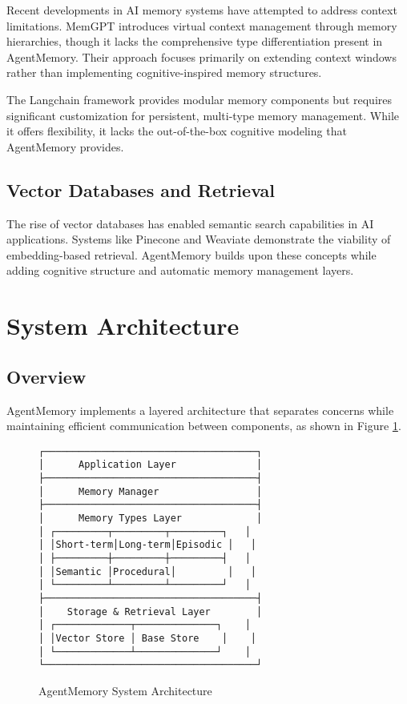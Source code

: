 \documentclass[journal]{IEEEtran}
\begin{document}
Recent developments in AI memory systems have attempted to address context limitations. MemGPT \cite{charles2023} introduces virtual context management through memory hierarchies, though it lacks the comprehensive type differentiation present in AgentMemory. Their approach focuses primarily on extending context windows rather than implementing cognitive-inspired memory structures.

The Langchain framework \cite{chase2022} provides modular memory components but requires significant customization for persistent, multi-type memory management. While it offers flexibility, it lacks the out-of-the-box cognitive modeling that AgentMemory provides.

\subsection{Vector Databases and Retrieval}

The rise of vector databases has enabled semantic search capabilities in AI applications. Systems like Pinecone and Weaviate demonstrate the viability of embedding-based retrieval. AgentMemory builds upon these concepts while adding cognitive structure and automatic memory management layers.

\section{System Architecture}

\subsection{Overview}

AgentMemory implements a layered architecture that separates concerns while maintaining efficient communication between components, as shown in Figure \ref{fig:architecture}.

\begin{figure}[h]
\centering
\begin{verbatim}
┌─────────────────────────────────────┐
│      Application Layer              │
├─────────────────────────────────────┤
│      Memory Manager                 │
├─────────────────────────────────────┤
│      Memory Types Layer             │
│ ┌─────────┬─────────┬─────────┐   │
│ │Short-term│Long-term│Episodic │   │
│ ├─────────┼─────────┼─────────┤   │
│ │Semantic │Procedural│         │   │
│ └─────────┴─────────┴─────────┘   │
├─────────────────────────────────────┤
│    Storage & Retrieval Layer        │
│ ┌─────────────┬──────────────┐    │
│ │Vector Store │ Base Store    │    │
│ └─────────────┴──────────────┘    │
└─────────────────────────────────────┘
\end{verbatim}
\caption{AgentMemory System Architecture}
\label{fig:architecture}
\end{figure}
\end{document}
